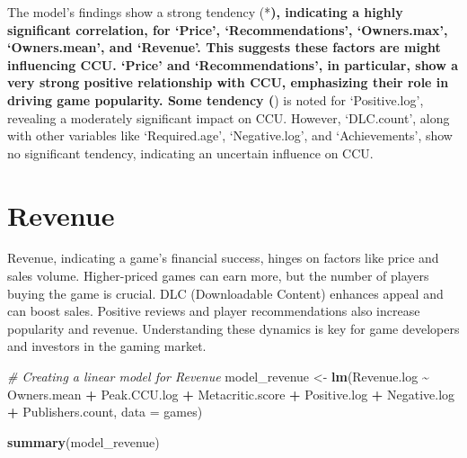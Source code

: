 \documentclass[
]{article}
\newenvironment{Shaded}{\begin{snugshade}}{\end{snugshade}}
\newcommand{\AttributeTok}[1]{\textcolor[rgb]{0.13,0.29,0.53}{#1}}
\newcommand{\CommentTok}[1]{\textcolor[rgb]{0.56,0.35,0.01}{\textit{#1}}}
\newcommand{\FunctionTok}[1]{\textcolor[rgb]{0.13,0.29,0.53}{\textbf{#1}}}
\newcommand{\NormalTok}[1]{#1}
\newcommand{\OtherTok}[1]{\textcolor[rgb]{0.56,0.35,0.01}{#1}}
\newcommand{\SpecialCharTok}[1]{\textcolor[rgb]{0.81,0.36,0.00}{\textbf{#1}}}
\begin{document}
The model's findings show a strong tendency (*\textbf{), indicating a
highly significant correlation, for `Price', `Recommendations',
`Owners.max', `Owners.mean', and `Revenue'. This suggests these factors
are might influencing CCU. `Price' and `Recommendations', in particular,
show a very strong positive relationship with CCU, emphasizing their
role in driving game popularity. Some tendency (}) is noted for
`Positive.log', revealing a moderately significant impact on CCU.
However, `DLC.count', along with other variables like `Required.age',
`Negative.log', and `Achievements', show no significant tendency,
indicating an uncertain influence on CCU.

\hypertarget{revenue}{%
\section{Revenue}\label{revenue}}

Revenue, indicating a game's financial success, hinges on factors like
price and sales volume. Higher-priced games can earn more, but the
number of players buying the game is crucial. DLC (Downloadable Content)
enhances appeal and can boost sales. Positive reviews and player
recommendations also increase popularity and revenue. Understanding
these dynamics is key for game developers and investors in the gaming
market.

\begin{Shaded}
\begin{Highlighting}[]
\CommentTok{\# Creating a linear model for Revenue}
\NormalTok{model\_revenue }\OtherTok{\textless{}{-}} \FunctionTok{lm}\NormalTok{(Revenue.log }\SpecialCharTok{\textasciitilde{}}\NormalTok{  Owners.mean }\SpecialCharTok{+}\NormalTok{ Peak.CCU.log }\SpecialCharTok{+}
\NormalTok{                      Metacritic.score }\SpecialCharTok{+}\NormalTok{ Positive.log }\SpecialCharTok{+}\NormalTok{ Negative.log }\SpecialCharTok{+}
\NormalTok{                      Publishers.count, }\AttributeTok{data =}\NormalTok{ games)}

\FunctionTok{summary}\NormalTok{(model\_revenue)}
\end{Highlighting}
\end{Shaded}
\end{document}
